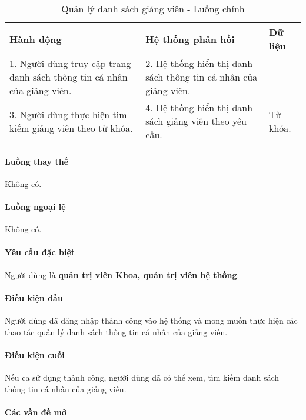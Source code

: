 \documentclass[./../main.tex]{subfiles}
\begin{document}
\begin{table}[H]
  \caption{Quản lý danh sách giảng viên - Luồng chính}
  \label{tab:orgAdmin_manage_lecturers}
  \begin{tabularx}{\textwidth}{|X|X|X|}
    \hline
    \textbf{Hành động} & \textbf{Hệ thống phản hồi} & \textbf{Dữ liệu} \\ \hline
    1. Người dùng truy cập trang danh sách thông tin cá nhân của giảng viên. & 2. Hệ thống hiển thị danh sách thông tin cá nhân của giảng viên. &  \\ \hline
    3. Người dùng thực hiện tìm kiếm giảng viên theo từ khóa. & 4. Hệ thống hiển thị danh sách giảng viên theo yêu cầu. & Từ khóa. \\ \hline
  \end{tabularx}
\end{table}

\paragraph*{Luồng thay thế} Không có.

\paragraph*{Luồng ngoại lệ} Không có.

\paragraph*{Yêu cầu đặc biệt}

Người dùng là \textbf{quản trị viên Khoa, quản trị viên hệ thống}.

\paragraph*{Điều kiện đầu}

Người dùng đã đăng nhập thành công vào hệ thống và mong muốn thực hiện các thao tác quản lý danh sách thông tin cá nhân của giảng viên.

\paragraph*{Điều kiện cuối}

Nếu ca sử dụng thành công, người dùng đã có thể xem, tìm kiếm danh sách thông tin cá nhân của giảng viên.

\paragraph*{Các vấn đề mở}
\end{document}
